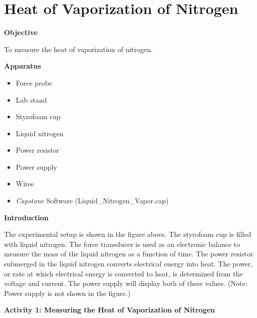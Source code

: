 
\section{Heat of Vaporization of Nitrogen}


\makelabheader %

\textbf{Objective}

To measure the heat of vaporization of nitrogen.

\textbf{Apparatus}

\begin{itemize}
\item Force probe
\item Lab stand
\item Styrofoam cup
\item Liquid nitrogen
\item Power resistor
\item Power supply
\item Wires
\item \textit{Capstone} Software (Liquid\_Nitrogen\_Vapor.cap)
\end{itemize}
\vspace{0.3cm}
{\centering {} \par}
\vspace{0.3cm}

\textbf{Introduction}

The experimental setup is shown in the figure above. The styrofoam
cup is filled with liquid nitrogen. The force transducer is used as
an electronic balance to measure the mass of the liquid nitrogen as
a function of time. The power resistor submerged in the liquid nitrogen
converts electrical energy into heat. The power, or rate at which
electrical energy is converted to heat, is determined from
the voltage and current.  The power supply will
display both of these values.
(Note: Power supply is
not shown in the figure.)

\textbf{Activity 1: Measuring the Heat of Vaporization of Nitrogen}

